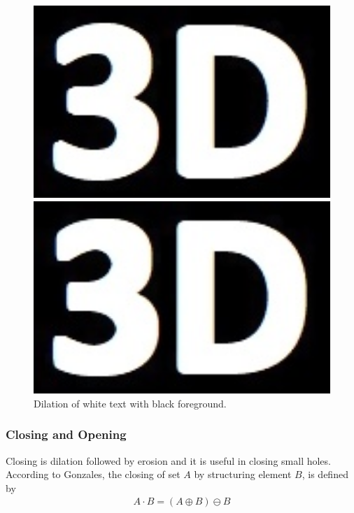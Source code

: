 \begin{figure}[h!]
\begin{minipage}[t]{0.24\textwidth}
		\centering	
		\includegraphics[width=1\textwidth]{figures/ImageAnalysis//Reconstruct/3D_Dilate_Ellipse.jpg}
	\end{minipage}
	\begin{minipage}[t]{0.24\textwidth}
		\centering	
		\includegraphics[width=1\textwidth]{figures/ImageAnalysis/Reconstruct/3D_Dilate_Rectangle.jpg}
	\end{minipage}
	\caption{Dilation of white text with black foreground.}
	\label{fig:dilation}
\end{figure}
\FloatBarrier

\subsubsection{Closing and Opening}
Closing is dilation followed by erosion and it is useful in closing small holes.\\

According to Gonzales, the closing of set $A$ by structuring element $B$, is defined by
\begin{align*}
	A\cdot B = \left(A \oplus B\right) \ominus B
\end{align*}

